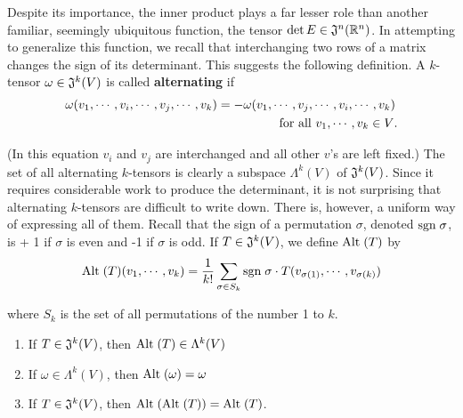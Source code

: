 Despite its importance, the inner product plays a far lesser
role than another familiar, seemingly ubiquitous function,
the tensor $\det E\in \mathfrak{J}^n(\mathbb{R}^n)$. In attempting to generalize this
function, we recall that interchanging two rows of a matrix
changes the sign of its determinant. This suggests the following definition.
A $k$-tensor $\omega\in \mathfrak{J}^k(V)$ is called \textbf{alternating} if
\begin{align*}
    \omega(v_1, \cdots, v_i, \cdots, v_j, \cdots, v_k) 
    & = -\omega(v_1, \cdots, v_j, \cdots, v_i, \cdots, v_k)\\
    &\hspace*{5em} \text{for all $v_1, \cdots, v_k\in V$.}
\end{align*}

(In this equation $v_i$ and $v_j$ are interchanged and all other $v$'s
are left fixed.) The set of all alternating $k$-tensors is clearly
a subspace $\Lambda^k(V)$ of $\mathfrak{J}^k(V)$. Since it requires considerable
work to produce the determinant, it is not surprising that
alternating $k$-tensors are difficult to write down.
There is, however, a uniform way of expressing all of them. Recall
that the sign of a permutation $\sigma$, denoted $\mathrm{sgn}\;\sigma$, 
is + 1 if $\sigma$ is even and -1 if $\sigma$ is odd. If 
$T \in \mathfrak{J}^k(V)$, we define $\mathrm{Alt}\;(T)$ by
\begin{align*}
  \mathrm{Alt}\;(T)(v_1, \cdots, v_k) = \frac{1}{k!}\sum_{\sigma\in S_k}^{}{\mathrm{sgn}\;\sigma\cdot T(v_{\sigma(1)}, \cdots, v_{\sigma(k)})}
\end{align*}

where $S_k$ is the set of all permutations of the number 1 to $k$.

\begin{theorem}
    \begin{enumerate}[label=\upshape{(\arabic*)}]
        \item If $T\in \mathfrak{J}^k(V)$, then $\mathrm{Alt}\;(T)\in \Lambda^k(V)$
        \item If $\omega \in \Lambda^k(V)$, then $\mathrm{Alt}\;(\omega)=\omega$
        \item If $T\in \mathfrak{J}^k(V)$, then $\mathrm{Alt}\;(\mathrm{Alt}\;(T)) = \mathrm{Alt}\;(T)$.
    \end{enumerate}
\end{theorem}

